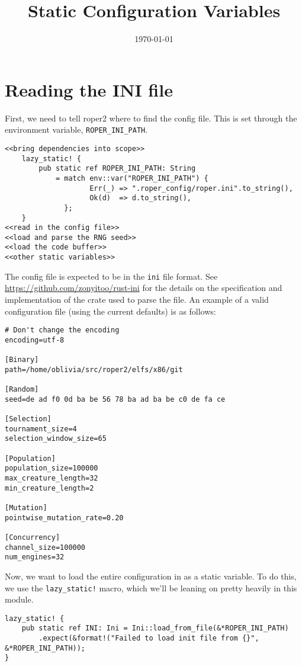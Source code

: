 \documentclass[11pt]{article}
\date{\today}
\title{Static Configuration Variables}
\begin{document}
\maketitle
\tableofcontents


\section{Reading the INI file}
\label{sec:org38f7e90}

First, we need to tell \gls{roper2} where to find the config file. This is
set through the environment variable, \texttt{ROPER\_INI\_PATH}.
\lstset{language=rust,label= ,caption= ,captionpos=b,numbers=none}
\begin{lstlisting}
<<bring dependencies into scope>>
    lazy_static! {
        pub static ref ROPER_INI_PATH: String
            = match env::var("ROPER_INI_PATH") {
                    Err(_) => ".roper_config/roper.ini".to_string(),
                    Ok(d)  => d.to_string(),
              };
    }
<<read in the config file>>
<<load and parse the RNG seed>>
<<load the code buffer>>
<<other static variables>>
\end{lstlisting}

The config file is expected to be in the \texttt{ini} file format. See 
\url{https://github.com/zonyitoo/rust-ini} for the details on the specification
and implementation of the crate used to parse the file. An example of a 
valid configuration file (using the current defaults) is as follows:

\begin{verbatim}
# Don't change the encoding
encoding=utf-8

[Binary]
path=/home/oblivia/src/roper2/elfs/x86/git

[Random]
seed=de ad f0 0d ba be 56 78 ba ad ba be c0 de fa ce

[Selection]
tournament_size=4
selection_window_size=65

[Population]
population_size=100000
max_creature_length=32
min_creature_length=2

[Mutation]
pointwise_mutation_rate=0.20

[Concurrency]
channel_size=100000
num_engines=32
\end{verbatim}

Now, we want to load the entire configuration in as a static variable.
To do this, we use the \texttt{lazy\_static!} macro, which we'll be leaning on
pretty heavily in this module. 

\lstset{language=rust,label=orgf1369ee,caption= ,captionpos=b,numbers=none}
\begin{lstlisting}
lazy_static! {
    pub static ref INI: Ini = Ini::load_from_file(&*ROPER_INI_PATH)
        .expect(&format!("Failed to load init file from {}", &*ROPER_INI_PATH));
}
\end{lstlisting}
\end{document}
